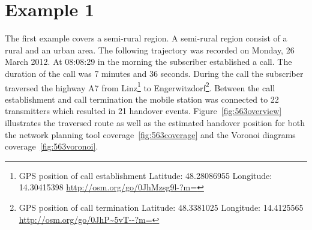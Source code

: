 \documentclass[master,english]{hgbthesis}
\begin{document}
\section{Example 1}
The first example covers a semi-rural region. A semi-rural region consist of a rural and an urban area. The following trajectory was recorded on Monday, 26 March 2012. At 08:08:29 in the morning the subscriber established a call. The duration of the call was 7 minutes and 36 seconds.  During the call the subscriber traversed the highway A7 from Linz\footnote{GPS position of call establishment Latitude: 48.28086955 Longitude:	14.30415398 \url{http://osm.org/go/0JhMzsg9l-?m=}} to Engerwitzdorf\footnote{GPS position of call termination Latitude: 48.3381025 Longitude:	14.4125565 \url{http://osm.org/go/0JhP~5vT--?m=}}. Between the call establishment and call termination the mobile station was connected to 22 transmitters which resulted in 21 handover events. Figure~\ref{fig:563overview} illustrates the traversed route as well as the estimated handover position for both the network planning tool coverage~\ref{fig:563coverage} and the Voronoi diagrams coverage~\ref{fig:563voronoi}.
\end{document}
